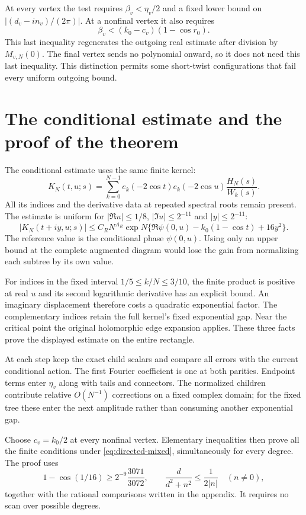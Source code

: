 At every vertex the test requires $\beta_v<\eta_v/2$ and a fixed
lower bound on $|(d_v-in_v)/(2\pi)|$. At a nonfinal vertex it also
requires
\[
                 \beta_v<(k_0-c_v)(1-\cos r_0).
\]
This last inequality regenerates the outgoing real estimate after
division by $M_{v,N}(0)$. The final vertex sends no polynomial onward,
so it does not need this last inequality. This distinction permits
some short-twist configurations that fail every uniform outgoing
bound.

\section{The conditional estimate and the proof of the theorem}

The conditional estimate uses the same finite kernel:
\[
 K_N(t,u;s)=\sum_{k=0}^{N-1}
 e_k(-2\cos t)e_k(-2\cos u)\frac{H_N(s)}{W_k(s)}.
\]
All its indices and the derivative data at repeated spectral roots
remain present. The estimate is uniform for
$|\Re u|\le1/8$, $|\Im u|\le2^{-11}$ and $|y|\le2^{-11}$:
\[
 |K_N(t+iy,u;s)|
 \le C_RN^{A_R}
 \exp N\{\Re\psi(0,u)-k_0(1-\cos t)+16y^2\}.
\]
The reference value is the conditional phase $\psi(0,u)$.
Using only an upper bound at the complete augmented diagram would
lose the gain from normalizing each subtree by its own value.

For indices in the fixed interval $1/5\le k/N\le3/10$, the
finite product is positive at real $u$ and its second logarithmic
derivative has an explicit bound. An imaginary displacement therefore
costs a quadratic exponential factor. The complementary indices
retain the full kernel's fixed exponential gap. Near the critical
point the original holomorphic edge expansion applies. These three
facts prove the displayed estimate on the entire rectangle.

At each step keep the exact child scalars and compare all errors with
the current conditional action. The first Fourier coefficient is one
at both parities. Endpoint terms enter $\eta_v$ along with tails and
connectors. The normalized children contribute relative $O(N^{-1})$
corrections on a fixed complex domain; for the fixed tree these enter
the next amplitude rather than consuming another exponential gap.

Choose $c_v=k_0/2$ at every nonfinal vertex. Elementary inequalities
then prove all the finite conditions under \eqref{eq:directed-mixed},
simultaneously for every degree. The proof uses
\[
 1-\cos(1/16)\ge 2^{-9}\frac{3071}{3072},
 \qquad
 \frac{d}{d^2+n^2}\le\frac1{2|n|}\quad(n\ne0),
\]
together with the rational comparisons written in the appendix.
It requires no scan over possible degrees.

